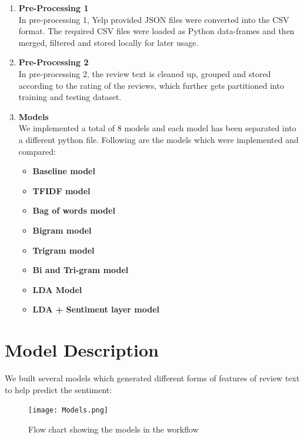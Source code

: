 \documentclass[paper=a4, fontsize=11pt]{scrartcl} %
\numberwithin{equation}{section} %
\numberwithin{figure}{section} %
\numberwithin{table}{section} %
\begin{document}
\begin{enumerate}
\item \textbf{Pre-Processing 1}\\
In pre-processing 1, Yelp provided JSON files were converted into the CSV format. The required CSV files were loaded as Python data-frames and then merged, filtered and stored locally for later usage.

\item \textbf{Pre-Processing 2}\\
In pre-processing 2, the review text is cleaned up, grouped and stored according to the rating of the reviews, which further gets partitioned into training and testing dataset.

\item	\textbf{Models}\\
We implemented a total of 8 models and each model has been separated into a different python file. Following are the models which were implemented and compared:
\begin{itemize}
\item \textbf{Baseline model}
\item \textbf{TFIDF model}
\item \textbf{Bag of words model}
\item \textbf{Bigram model}
\item \textbf{Trigram model}
\item \textbf{Bi and Tri-gram model}
\item \textbf{LDA Model}
\item \textbf{LDA + Sentiment layer model}
\end{itemize}
\end{enumerate}

\section{Model Description}
We built several models which generated different forms of features of review text to help predict the sentiment:

\begin{figure}
\centering
\texttt{[image: Models.png]}
\caption{Flow chart showing the models in the workflow}
\label{models_diag}
\end{figure} 
\end{document}
